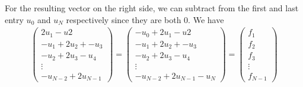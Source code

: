 For the resulting vector on the right side, we can subtract from the first and last entry \(u_0\) and \(u_N\) respectively since they are both \(0\). We have
\begin{align*}
    \begin{pmatrix}
        2u_1 - u2 \\
        -u_1 + 2u_2 + -u_3 \\
        -u_2 + 2 u_3 - u_4 \\
        \vdots \\
        -u_{N-2} + 2 u_{N - 1}
    \end{pmatrix}
    =
    \begin{pmatrix}
        -u_0 + 2u_1 - u2 \\
        -u_1 + 2u_2 + -u_3 \\
        -u_2 + 2 u_3 - u_4 \\
        \vdots \\
        -u_{N-2} + 2 u_{N - 1} - u_N
    \end{pmatrix}
    =
    \begin{pmatrix}
        f_1 \\
        f_2 \\
        f_3 \\
        \vdots \\
        f_{N-1}
    \end{pmatrix}
\end{align*}